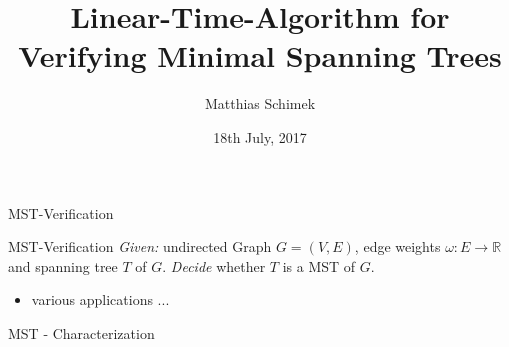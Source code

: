 \documentclass[18pt]{beamer}
\title[Linear-Time Algorithm for Verifiying MST]{Linear-Time-Algorithm for Verifying Minimal Spanning Trees}
\author{Matthias Schimek}
\institute{Institute of Theoretical Informatics}
\date{18th July, 2017}
\begin{document}

\begin{frame}
\titlepage
\end{frame}

\begin{frame}{MST-Verification}
	\begin{block}{MST-Verification}
	\emph{Given:} undirected Graph $G=(V,E)$, edge weights $\omega: E \rightarrow \mathbb{R}$ and spanning tree $T$ of $G$.
	\emph{Decide} whether $T$ is a MST of $G$.
	\end{block}
	\pause
	\begin{itemize}
		\item various applications ...
	\end{itemize}
	\pause
	\begin{block}{MST - Characterization}
	\end{block}
\end{frame}
\end{document}
